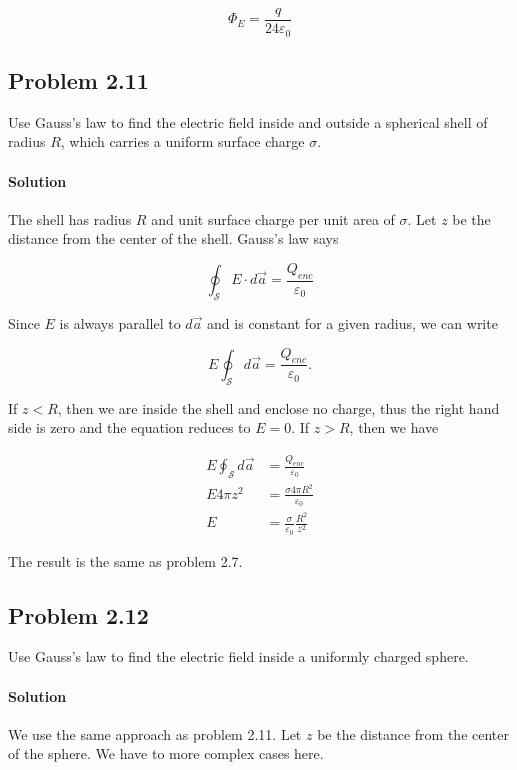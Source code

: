 \documentclass{article}
\begin{document}
$$
\Phi_E = \frac{q}{24\varepsilon_0}
$$

\newpage

\subsection*{Problem 2.11}
Use Gauss's law to find the electric field inside and outside a spherical shell of radius $R$, which carries a uniform surface charge $\sigma$.

\paragraph{Solution} The shell has radius $R$ and unit surface charge per unit area of $\sigma$. Let $z$ be the distance from the center of the shell. Gauss's law says 

$$
\oint_{\mathcal{S}} E \cdot d\vec{a} = \frac{Q_{enc}}{\varepsilon_0} 
$$

Since $E$ is always parallel to $d\vec{a}$ and is constant for a given radius, we can write 

$$
E \oint_{\mathcal{S}}d\vec{a} = \frac{Q_{enc}}{\varepsilon_0}.
$$

If $z < R$, then we are inside the shell and enclose no charge, thus the right hand side is zero and the equation reduces to $E = 0$.  If $z > R$, then we have 

\begin{align*}
    E\oint_{\mathcal{S}}d\vec{a} &= \frac{Q_{enc}}{\varepsilon_0} \\
    E 4\pi z^2 &= \frac{\sigma 4\pi R^2}{\varepsilon_0}\\
    E &= \frac{\sigma}{\varepsilon_0}\frac{R^2}{z^2}
\end{align*}

The result is the same as problem 2.7.

\newpage
\subsection*{Problem 2.12}
Use Gauss's law to find the electric field inside a uniformly charged sphere.

\paragraph{Solution} We use the same approach as problem 2.11. Let $z$ be the distance from the center of the sphere.  We have to more complex cases here. \\
\end{document}
